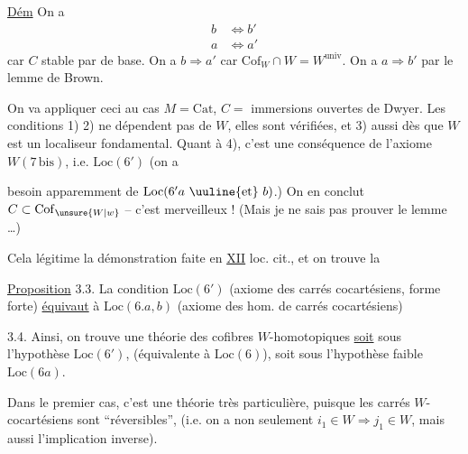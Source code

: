 \uline{Dém} \qquad On a
\[
\begin{aligned}
b&\Longleftrightarrow b'\\
a&\Longleftrightarrow a'
\end{aligned}
\]
car $C$ stable par  de base. On a $b\Longrightarrow a'$ car $\mathrm{Cof}_W\cap W=W^{\mathrm{univ}}$.  On a $a\Longrightarrow b'$ par le lemme de Brown.

On va appliquer ceci au cas $M=\mathrm{Cat}$, $C=$ immersions ouvertes de Dwyer. Les conditions 1) 2) ne dépendent pas de $W$, elles sont vérifiées, et 3) aussi dès que $W$ est un localiseur fondamental. Quant à 4), c'est une conséquence de l'axiome $W(7\,\mathrm{bis})$, i.e. $\mathrm{Loc}(6')$ (on a

besoin apparemment de $\mathrm{Loc}(6'a\ \text{\uuline{et}}\ b)$.) On en conclut $C\subset\mathrm{Cof}_{\unsure{W|w}}$ -- c'est merveilleux ! (Mais je ne sais pas prouver le lemme \ldots)

Cela légitime la démonstration faite en \uline{XII} loc. cit., et on trouve la

\uline{Proposition} 3.3. La condition $\mathrm{Loc}(6')$ (axiome des carrés cocartésiens, forme forte)  \uline{équivaut} à $\mathrm{Loc}(6.a,b)$ (axiome des hom. de carrés cocartésiens) 

3.4. Ainsi, on trouve une théorie des cofibres $W$-homotopiques \uline{soit} sous l'hypothèse $\mathrm{Loc}(6')$, (équivalente à $\mathrm{Loc}(6)$), soit sous l'hypothèse  faible $\mathrm{Loc}(6a)$.

Dans le premier cas, c'est une théorie  très particulière, puisque les carrés $W$-cocartésiens sont ``réversibles'', (i.e. on a  non seulement $i_1\in W\Longrightarrow j_1\in W$, mais aussi l'implication inverse).

